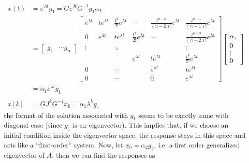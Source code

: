 \documentclass[twoside]{article}
\begin{document}
\begin{align*}
	x(t) &= e^{A t} g_1 = G e^{J t} G^{-1} g_1 \alpha_1
	\\ &= \left[ \begin{array}{ccc} g_1 & \cdots g_n \end{array} \right] 
\left[  \begin{array}{cccccc} e^{\lambda t} & t e^{\lambda t} & \frac{t^2}{2 !} e^{\lambda t} 
& \cdots & \frac{t^{n-2}}{(n-2) !} e^{\lambda t}  & \frac{t^{n-1}}{(n-1) !} e^{\lambda t}
\\ 0 & e^{\lambda t} & t e^{\lambda t} & \frac{t^2}{2 !} e^{\lambda t} & \cdots  & \frac{t^{n-2}}{(n-2) !} e^{\lambda t}
\\  \vdots &  & \ddots &  &  & \vdots \\ 
& & & e^{\lambda t} & t e^{\lambda t} & \frac{t^2}{2 !} e^{\lambda t}
\\ 0 &  & \cdots  &  & e^{\lambda t} & t e^{\lambda t} \\
0 &  & \cdots &  & 0 & e^{\lambda t} \end{array} \right] 
%
	\left[ \begin{array}{c} \alpha_1 \\ 0 \\ \vdots \\ 0 \end{array} \right] 
	\\ &= \alpha_1 e^{\lambda t} g_1  
       \\
       \\
	x[k] &= G J^k G^{-1} x_0 = \alpha_1 \lambda^k g_1   
\end{align*}
%
the format of the solution associated with $g_1$ seems to be exactly same with diagonal case (since $g_1$ is an eigenvector). 
This implies that, if we choose an initial condition inside the eigenvector space, the response stays in this space and acts like a 
``first-order'' system. Now, let $x_0 = \alpha_2 g_2$, i.e. a first order generalized eigenvector of $A$, then we can find the responses as
\end{document}
